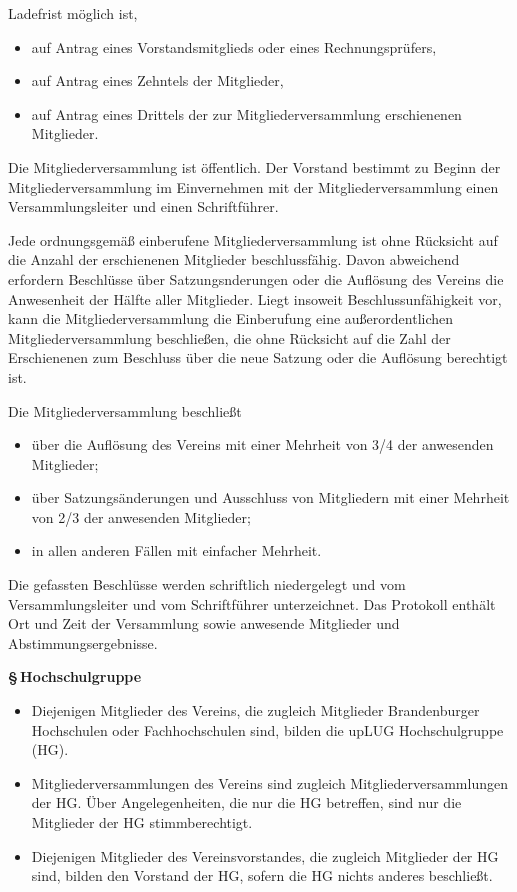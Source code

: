 \documentclass[11pt]{article}
\def\items#1{{%
  \itcounter0%
  \begin{itemize}
  #1
  \end{itemize}
}}
\let\it\item%
\def\item{
  \advance\itcounter1%
  \it[(\the\itcounter)]
}
\def\paragraf#1{
  \advance\itcounter1%
  \par\medskip
  {\large\bfseries \S\,\the\itcounter\quad#1}
  \par\smallskip
}
\begin{document}
{       Ladefrist m{\"o}glich ist,
      \items{
        \item auf Antrag eines Vorstandsmitglieds oder eines Rechnungspr{\"u}fers,
        \item auf Antrag eines Zehntels der Mitglieder,
        \item auf Antrag eines Drittels der zur Mitgliederversammlung erschienenen Mitglieder.
       }
   \item
       Die Mitgliederversammlung ist {\"o}ffentlich. Der Vorstand bestimmt zu Beginn der Mitglieder\-ver\-sammlung
       im Einvernehmen mit der Mitgliederversammlung einen Versammlungsleiter und einen Schriftf{\"u}hrer.
   \item 
         Jede ordnungsgem{\"a}{\ss} einberufene Mitgliederversammlung ist ohne R{\"u}cksicht auf
         die Anzahl der erschienenen Mitglieder beschlussf{\"a}hig.
         Davon abweichend erfordern Beschl{\"u}sse {\"u}ber Satzungsnderungen oder
         die Aufl{\"o}sung des Vereins die
         Anwesenheit der H{\"a}lfte aller Mitglieder. Liegt insoweit Beschlussunf{\"a}higkeit
         vor, kann die Mitgliederversammlung die Einberufung eine au{\ss}erordentlichen
         Mitgliederversammlung beschlie{\ss}en, die ohne R{\"u}cksicht auf die Zahl der Erschienenen zum
         Beschluss {\"u}ber die neue Satzung oder die Aufl{\"o}sung berechtigt ist.
   \item
     Die Mitgliederversammlung beschlie{\ss}t
     \items{
       \item {\"u}ber die Aufl{\"o}sung des Vereins mit  einer Mehrheit von 3/4 der anwesenden Mitglieder;
       \item {\"u}ber Satzungs{\"a}nderungen und Ausschluss von Mitgliedern mit einer Mehrheit von
                2/3 der anwesenden Mitglieder;
       \item in allen anderen F{\"a}llen mit einfacher Mehrheit.
     }
   \item Die gefassten Beschl{\"u}sse werden schriftlich niedergelegt und vom
        Versammlungsleiter und vom Schriftf{\"u}hrer unterzeichnet. Das Protokoll enth{\"a}lt
        Ort und Zeit der Versammlung sowie anwesende Mitglieder und Abstimmungsergebnisse.
}



\paragraf{Hochschulgruppe}

\items{
  \item
    Diejenigen Mitglieder des Vereins, die zugleich Mitglieder Brandenburger Hochschulen oder
    Fachhochschulen sind, bilden die \glqq upLUG Hochschulgruppe\grqq{} (HG).
  \item
    Mitgliederversammlungen des Vereins sind zugleich Mitgliederversammlungen der HG.
    {\"U}ber Angelegenheiten, die nur die HG betreffen, sind nur die Mitglieder der HG
    stimmberechtigt.
  \item
    Diejenigen Mitglieder des Vereinsvorstandes, die zugleich
    Mitglieder der HG sind, bilden den Vorstand der HG, sofern die HG nichts anderes beschlie{\ss}t.
}
\end{document}
